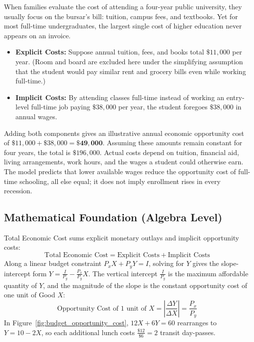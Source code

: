 \documentclass[11pt,letterpaper]{article}
\begin{document}
\begin{tcolorbox}[colback=CourseTeal!8!white,colframe=CourseTeal!80!black,title=\textbf{Bring It Home: The True Economic Cost of a College Degree}]
When families evaluate the cost of attending a four-year public university, they usually focus on the bursar's bill: tuition, campus fees, and textbooks. Yet for most full-time undergraduates, the largest single cost of higher education never appears on an invoice.
\begin{itemize}
    \item \textbf{Explicit Costs:} Suppose annual tuition, fees, and books total $\$11{,}000$ per year. (Room and board are excluded here under the simplifying assumption that the student would pay similar rent and grocery bills even while working full-time.)
    \item \textbf{Implicit Costs:} By attending classes full-time instead of working an entry-level full-time job paying $\$38{,}000$ per year, the student foregoes $\$38{,}000$ in annual wages.
\end{itemize}
Adding both components gives an illustrative annual economic opportunity cost of $\$11{,}000 + \$38{,}000 = \mathbf{\$49{,}000}$. Assuming these amounts remain constant for four years, the total is $\$196{,}000$. Actual costs depend on tuition, financial aid, living arrangements, work hours, and the wages a student could otherwise earn. The model predicts that lower available wages reduce the opportunity cost of full-time schooling, all else equal; it does not imply enrollment rises in every recession.
\end{tcolorbox}

\subsection*{Mathematical Foundation (Algebra Level)}
Total Economic Cost sums explicit monetary outlays and implicit opportunity costs:
\begin{equation}
\text{Total Economic Cost} = \text{Explicit Costs} + \text{Implicit Costs}
\end{equation}
Along a linear budget constraint $P_x X + P_y Y = I$, solving for $Y$ gives the slope-intercept form $Y = \frac{I}{P_y} - \frac{P_x}{P_y}X$. The vertical intercept $\frac{I}{P_y}$ is the maximum affordable quantity of $Y$, and the magnitude of the slope is the constant opportunity cost of one unit of Good $X$:
\begin{equation}
\text{Opportunity Cost of } 1 \text{ unit of } X = \left|\frac{\Delta Y}{\Delta X}\right| = \frac{P_x}{P_y}
\end{equation}
In Figure~\ref{fig:budget_opportunity_cost}, $12X + 6Y = 60$ rearranges to $Y = 10 - 2X$, so each additional lunch costs $\frac{\$12}{\$6} = 2$ transit day-passes.
\end{document}
